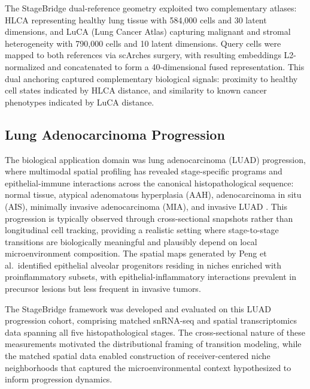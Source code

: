 The StageBridge dual-reference geometry exploited two complementary atlases: HLCA representing healthy lung tissue with 584,000 cells and 30 latent dimensions, and LuCA (Lung Cancer Atlas) capturing malignant and stromal heterogeneity with 790,000 cells and 10 latent dimensions. Query cells were mapped to both references via scArches surgery, with resulting embeddings L2-normalized and concatenated to form a 40-dimensional fused representation. This dual anchoring captured complementary biological signals: proximity to healthy cell states indicated by HLCA distance, and similarity to known cancer phenotypes indicated by LuCA distance.


\subsection{Lung Adenocarcinoma Progression}

The biological application domain was lung adenocarcinoma (LUAD) progression, where multimodal spatial profiling has revealed stage-specific programs and epithelial-immune interactions across the canonical histopathological sequence: normal tissue, atypical adenomatous hyperplasia (AAH), adenocarcinoma in situ (AIS), minimally invasive adenocarcinoma (MIA), and invasive LUAD \cite{Peng2025-xu}. This progression is typically observed through cross-sectional snapshots rather than longitudinal cell tracking, providing a realistic setting where stage-to-stage transitions are biologically meaningful and plausibly depend on local microenvironment composition. The spatial maps generated by Peng et al.\ identified epithelial alveolar progenitors residing in niches enriched with proinflammatory subsets, with epithelial-inflammatory interactions prevalent in precursor lesions but less frequent in invasive tumors.

The StageBridge framework was developed and evaluated on this LUAD progression cohort, comprising matched snRNA-seq and spatial transcriptomics data spanning all five histopathological stages. The cross-sectional nature of these measurements motivated the distributional framing of transition modeling, while the matched spatial data enabled construction of receiver-centered niche neighborhoods that captured the microenvironmental context hypothesized to inform progression dynamics.

